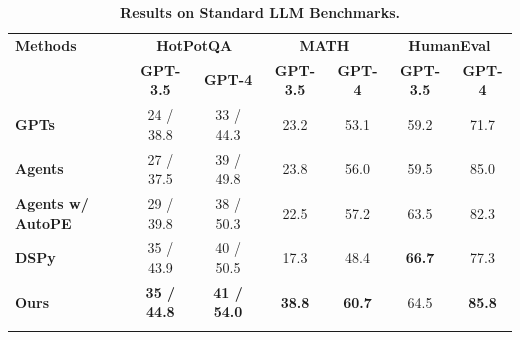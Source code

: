 \begin{table}[htb]
  \centering
      \caption{\textbf{Results on Standard LLM Benchmarks.}}
      \label{tab:benchmark_results}
\renewcommand\tabcolsep{8pt}
\renewcommand\arraystretch{1.2}
  \begin{tabular}{l|cc|cc|cc} %
\Xhline{1.5pt}
\textbf{Methods} & \multicolumn{2}{c|}{\textbf{HotPotQA}} & \multicolumn{2}{c|}{\textbf{MATH}} & \multicolumn{2}{c}{\textbf{HumanEval}} \\
                 & \textbf{GPT-3.5}  & \textbf{GPT-4} & \textbf{GPT-3.5}  & \textbf{GPT-4} & \textbf{GPT-3.5}  & \textbf{GPT-4} \\
\Xhline{1.5pt}
\bf GPTs &   24 / 38.8 & 33 / 44.3  & 23.2 & 53.1 & 59.2  &  71.7 \\
\bf Agents  & 27 / 37.5 & 39 / 49.8  & 23.8 & 56.0 & 59.5 & 85.0 \\
\bf Agents w/ AutoPE & 29 / 39.8 & 38 / 50.3  & 22.5  & 57.2  & 63.5  &  82.3 \\
\bf DSPy & 35 / 43.9 & 40 / 50.5  & 17.3 & 48.4 & \bf 66.7  & 77.3 \\ \hline

\bf Ours  & \bf 35 / 44.8 & \bf 41 / 54.0  & \bf 38.8  & \bf 60.7  & 64.5  & \bf 85.8   \\ \hline
\Xhline{1.5pt}
\end{tabular}
\end{table}
\vspace{-10pt}
